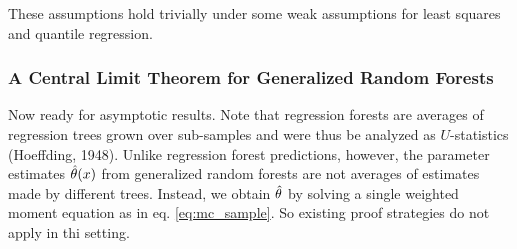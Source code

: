 These assumptions hold trivially under some weak assumptions for least squares and quantile regression.

\subsubsection{A Central Limit Theorem for Generalized Random Forests}

Now ready for asymptotic results. Note that regression forests are averages of regression trees grown over sub-samples and were thus be analyzed as $U$-statistics (Hoeffding, 1948). Unlike regression forest predictions, however, the parameter estimates $\hat{\theta}(x)$ from generalized random forests are not averages of estimates made by different trees. Instead, we obtain $\hat{\theta}$ by solving a single weighted moment equation as in eq. \ref{eq:mc_sample}. So existing proof strategies do not apply in thi setting. 

